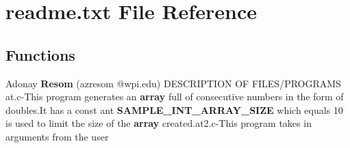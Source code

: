\section{readme.\+txt File Reference}
\label{readme_8txt}
\subsection*{Functions}
\begin{DoxyCompactItemize}
\item 
Adonay {\bf Resom} (azresom @wpi.\+edu) D\+E\+S\+C\+R\+I\+P\+T\+I\+ON OF F\+I\+L\+ES/P\+R\+O\+G\+R\+A\+MS at.\+c-\/This program generates an {\bf array} full of consecutive numbers in the form of doubles.\+It has a const ant {\bf S\+A\+M\+P\+L\+E\+\_\+\+I\+N\+T\+\_\+\+A\+R\+R\+A\+Y\+\_\+\+S\+I\+ZE} which equals 10 is used to limit the size of the {\bf array} created.\+at2.\+c-\/This program takes in arguments from the user
\end{DoxyCompactItemize}
